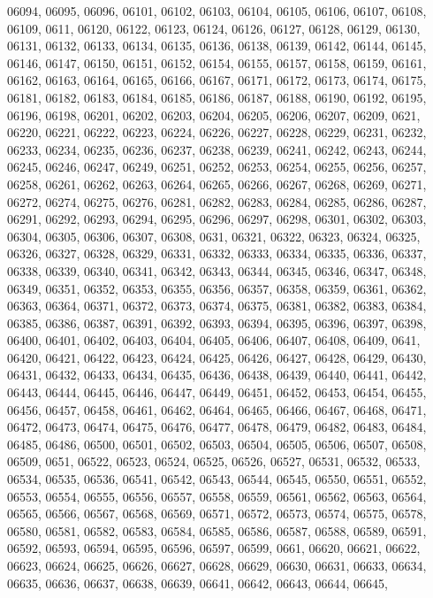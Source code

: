 {06094,
06095,
06096,
06101,
06102,
06103,
06104,
06105,
06106,
06107,
06108,
06109,
0611,
06120,
06122,
06123,
06124,
06126,
06127,
06128,
06129,
06130,
06131,
06132,
06133,
06134,
06135,
06136,
06138,
06139,
06142,
06144,
06145,
06146,
06147,
06150,
06151,
06152,
06154,
06155,
06157,
06158,
06159,
06161,
06162,
06163,
06164,
06165,
06166,
06167,
06171,
06172,
06173,
06174,
06175,
06181,
06182,
06183,
06184,
06185,
06186,
06187,
06188,
06190,
06192,
06195,
06196,
06198,
06201,
06202,
06203,
06204,
06205,
06206,
06207,
06209,
0621,
06220,
06221,
06222,
06223,
06224,
06226,
06227,
06228,
06229,
06231,
06232,
06233,
06234,
06235,
06236,
06237,
06238,
06239,
06241,
06242,
06243,
06244,
06245,
06246,
06247,
06249,
06251,
06252,
06253,
06254,
06255,
06256,
06257,
06258,
06261,
06262,
06263,
06264,
06265,
06266,
06267,
06268,
06269,
06271,
06272,
06274,
06275,
06276,
06281,
06282,
06283,
06284,
06285,
06286,
06287,
06291,
06292,
06293,
06294,
06295,
06296,
06297,
06298,
06301,
06302,
06303,
06304,
06305,
06306,
06307,
06308,
0631,
06321,
06322,
06323,
06324,
06325,
06326,
06327,
06328,
06329,
06331,
06332,
06333,
06334,
06335,
06336,
06337,
06338,
06339,
06340,
06341,
06342,
06343,
06344,
06345,
06346,
06347,
06348,
06349,
06351,
06352,
06353,
06355,
06356,
06357,
06358,
06359,
06361,
06362,
06363,
06364,
06371,
06372,
06373,
06374,
06375,
06381,
06382,
06383,
06384,
06385,
06386,
06387,
06391,
06392,
06393,
06394,
06395,
06396,
06397,
06398,
06400,
06401,
06402,
06403,
06404,
06405,
06406,
06407,
06408,
06409,
0641,
06420,
06421,
06422,
06423,
06424,
06425,
06426,
06427,
06428,
06429,
06430,
06431,
06432,
06433,
06434,
06435,
06436,
06438,
06439,
06440,
06441,
06442,
06443,
06444,
06445,
06446,
06447,
06449,
06451,
06452,
06453,
06454,
06455,
06456,
06457,
06458,
06461,
06462,
06464,
06465,
06466,
06467,
06468,
06471,
06472,
06473,
06474,
06475,
06476,
06477,
06478,
06479,
06482,
06483,
06484,
06485,
06486,
06500,
06501,
06502,
06503,
06504,
06505,
06506,
06507,
06508,
06509,
0651,
06522,
06523,
06524,
06525,
06526,
06527,
06531,
06532,
06533,
06534,
06535,
06536,
06541,
06542,
06543,
06544,
06545,
06550,
06551,
06552,
06553,
06554,
06555,
06556,
06557,
06558,
06559,
06561,
06562,
06563,
06564,
06565,
06566,
06567,
06568,
06569,
06571,
06572,
06573,
06574,
06575,
06578,
06580,
06581,
06582,
06583,
06584,
06585,
06586,
06587,
06588,
06589,
06591,
06592,
06593,
06594,
06595,
06596,
06597,
06599,
0661,
06620,
06621,
06622,
06623,
06624,
06625,
06626,
06627,
06628,
06629,
06630,
06631,
06633,
06634,
06635,
06636,
06637,
06638,
06639,
06641,
06642,
06643,
06644,
06645,
}
